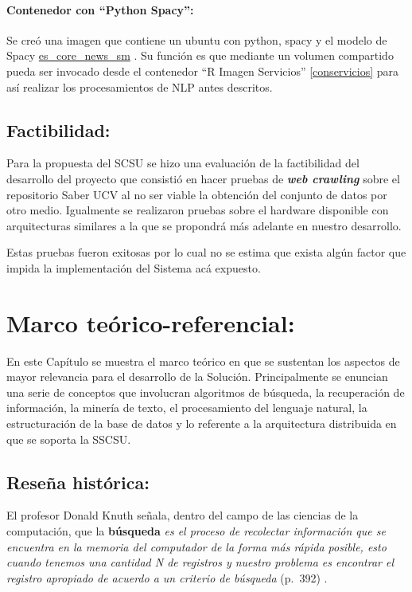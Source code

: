 \documentclass[
  10,
  openany]{book}
\begin{document}
\hypertarget{conspacy}{%
\subsubsection{Contenedor con ``Python Spacy'':}\label{conspacy}}

Se creó una imagen que contiene un ubuntu con python, spacy y el modelo de Spacy \href{https://spacy.io/models/es\#es_core_news_sm}{es\_core\_news\_sm} . Su función es que mediante un volumen compartido pueda ser invocado desde el contenedor ``R Imagen Servicios'' \ref{conservicios} para así realizar los procesamientos de NLP antes descritos.

\hypertarget{factibilidad}{%
\section{Factibilidad:}\label{factibilidad}}

Para la propuesta del SCSU se hizo una evaluación de la factibilidad del desarrollo del proyecto que consistió en hacer pruebas de \textbf{\emph{web crawling}} sobre el repositorio Saber UCV al no ser viable la obtención del conjunto de datos por otro medio. Igualmente se realizaron pruebas sobre el hardware disponible con arquitecturas similares a la que se propondrá más adelante en nuestro desarrollo.

Estas pruebas fueron exitosas por lo cual no se estima que exista algún factor que impida la implementación del Sistema acá expuesto.

\hypertarget{teorico}{%
\chapter{Marco teórico-referencial:}\label{teorico}}

En este Capítulo se muestra el marco teórico en que se sustentan los aspectos de mayor relevancia para el desarrollo de la Solución. Principalmente se enuncian una serie de conceptos que involucran algoritmos de búsqueda, la recuperación de información, la minería de texto, el procesamiento del lenguaje natural, la estructuración de la base de datos y lo referente a la arquitectura distribuida en que se soporta la SSCSU.

\hypertarget{alghist}{%
\section{Reseña histórica:}\label{alghist}}

El profesor Donald Knuth señala, dentro del campo de las ciencias de la computación, que la \textbf{búsqueda} \emph{es el proceso de recolectar información que se encuentra en la memoria del computador de la forma más rápida posible, esto cuando tenemos una cantidad N de registros y nuestro problema es encontrar el registro apropiado de acuerdo a un criterio de búsqueda} \citep{knuth1997} (p.~392) .
\end{document}
